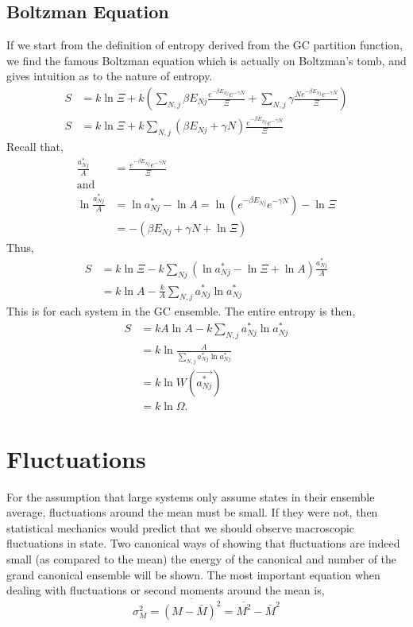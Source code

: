 \subsection{Boltzman Equation}
If we start from the definition of entropy derived from the GC partition
function, we find the famous Boltzman equation which is actually on Boltzman's
tomb, and gives intuition as to the nature of entropy.
\begin{align*}
	S &= k\ln\Xi + k \left( \sum_{N,j}{\beta E_{Nj} \frac{e^{-\beta E_{Nj}}
		e^{-\gamma N}}{\Xi}} +
		\sum_{N,j}{\gamma \frac{Ne^{-\beta E_{Nj}} e^{-\gamma N}}{\Xi}}
	\right) \\
	S &= k\ln\Xi + k \sum_{N,j}{\left( \beta E_{Nj} + \gamma N \right)
		\frac{e^{-\beta E_{Nj}} e^{-\gamma N}}{\Xi}}
\end{align*}
Recall that,
\begin{align*}
	\frac{a_{Nj}^*}{A} &= \frac{e^{-\beta E_{Nj}} e^{-\gamma N}}{\Xi}\\
	\text{and}\\
	\ln \frac{a_{Nj}^*}{A} &= \ln a_{Nj}^* - \ln A =
		\ln \left(e^{-\beta E_{Nj}} e^{-\gamma N} \right) - \ln\Xi\\
	&= -(\beta E_{Nj} + \gamma N + \ln\Xi)
\end{align*}
Thus,
\begin{align*}
	S &= k\ln\Xi - k \sum_{Nj}{(\ln{a_{Nj}^*} - \ln{\Xi} + \ln{A})
	\frac{a_{Nj}^*}{A}}\\
	  &= k\ln{A} - \frac{k}{A} \sum_{N,j}{a_{Nj}^*\ln{a_{Nj}^*}}
\end{align*}
This is for each system in the GC ensemble. The entire entropy is then,
\begin{align*}
	S &= kA\ln{A} - k\sum_{N,j}{a_{Nj}^*\ln{a_{Nj}^*}}\\
	  &= k \ln{\frac{A}{\sum_{N,j}{a_{Nj}^*\ln{a_{Nj}^*}}}}\\
	  &= k \ln{W(\vec{a_{Nj}^*})}\\
	  &= k \ln{\Omega}.
\end{align*}

\section{Fluctuations}\label{sec:Fluctuations}
For the assumption that large systems only assume states in their ensemble
average, fluctuations around the mean must be small. If they were not, then
statistical mechanics would predict that we should observe macroscopic
fluctuations in state. Two canonical ways of showing that fluctuations are
indeed small (as compared to the mean) the energy of the canonical and number of
the grand canonical ensemble will be shown. The most important equation when
dealing with fluctuations or second moments around the mean is,
\begin{equation*} 
	\sigma_M^2 = \overline{\left( M - \bar{M}\right)^2} = \overline{M^2} - \bar{M}^2
\end{equation*}

